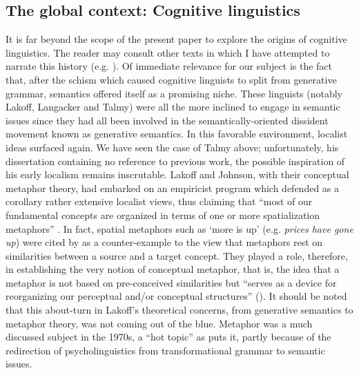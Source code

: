\documentclass[english,output=paper,colorlinks,citecolor=brown]{../langscibook}
\begin{document}
\subsection{The global context: Cognitive linguistics}

It is far beyond the scope of the present paper to explore the origins of cognitive linguistics. The reader may consult other texts in which I have attempted to narrate this history (e.g. \citealt{Fortis2015}). Of immediate relevance for our subject is the fact that, after the schism which caused cognitive linguists to split from generative grammar, semantics offered itself as a promising niche. These linguists (notably Lakoff, Langacker and Talmy) were all the more inclined to engage in semantic issues since they had all been involved in the semantically-oriented dissident movement known as generative semantics. In this favorable environment, localist ideas surfaced again. We have seen the case of Talmy above; unfortunately, his dissertation containing no reference to previous work, the possible inspiration of his early localism remains inscrutable. Lakoff and Johnson, with their conceptual metaphor theory, had embarked on an empiricist program which defended as a corollary rather extensive localist views, thus claiming that “most of our fundamental concepts are organized in terms of one or more spatialization metaphors” \citep[17]{LakoffJohnson1980}. In fact, spatial metaphors such as ‘more is up’ (e.g. \textit{prices have gone up}) were cited by \citet{Johnson1981} as a counter-example to the view that metaphors rest on similarities between a source and a target concept. They played a role, therefore, in establishing the very notion of conceptual metaphor, that is, the idea that a metaphor is not based on pre-conceived similarities but “serves as a device for reorganizing our perceptual and\slash or conceptual structures” (\citealt[31]{Johnson1981}). It should be noted that this about-turn in Lakoff’s theoretical concerns, from generative semantics to metaphor theory, was not coming out of the blue. Metaphor was a much discussed subject in the 1970s, a “hot topic” as \citet{Honeck1980} puts it, partly because of the redirection of psycholinguistics from transformational grammar to semantic issues.
\end{document}
